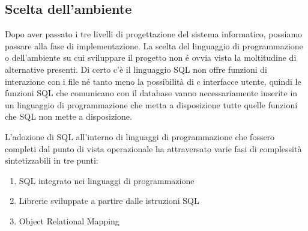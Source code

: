 \documentclass[12pt,a4paper,onecolumn,x11names]{article}
\begin{document}
	\subsection{Scelta dell'ambiente}
	\begin{flushleft}
		Dopo aver passato i tre livelli di progettazione del sistema informatico, possiamo passare alla fase di implementazione. La scelta del linguaggio di programmazione o dell'ambiente su cui sviluppare il progetto non \'{e} ovvia vista la moltitudine di alternative presenti. \newline
		Di certo c'è il linguaggio SQL non offre funzioni di interazione con i file n\'{e} tanto meno la possibilità di c interfacce utente, quindi le funzioni SQL che comunicano con il database vanno necessariamente inserite in un linguaggio di programmazione che metta a disposizione tutte quelle funzioni che SQL non mette a disposizione.\newline
		
		L'adozione di SQL all'interno di linguaggi di programmazione che fossero completi dal punto di vista operazionale ha attraversato varie fasi di complessità sintetizzabili in tre punti:
	\end{flushleft}
	\begin{enumerate}
		\item SQL integrato nei linguaggi di programmazione
		\item Librerie sviluppate a partire dalle istruzioni SQL
		\item Object Relational Mapping
	\end{enumerate}
\end{document}

